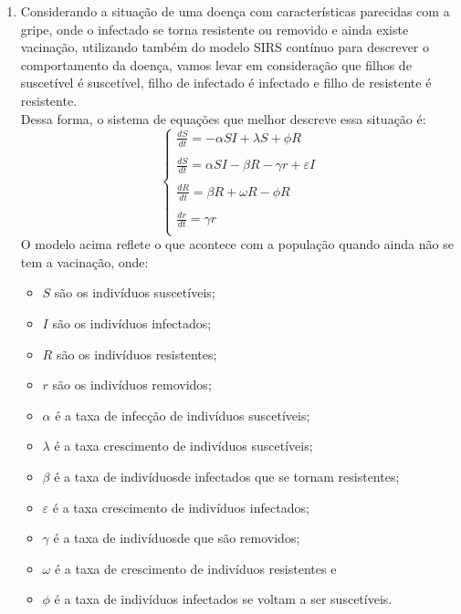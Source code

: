\documentclass[a4paper]{article}
\begin{document}
\begin{enumerate}
\item
Considerando a situa\c{c}\~ao de uma doen\c{c}a com caracter\'isticas parecidas com a gripe, onde o infectado se torna resistente ou removido e ainda existe vacina\c{c}\~ao, utilizando tamb\'em do modelo SIRS cont\'inuo para descrever o comportamento da doen\c{c}a, vamos levar em considera\c{c}\~ao que filhos de suscet\'ivel \'e suscet\'ivel, filho de infectado \'e infectado e filho de resistente \'e resistente. 
\\
Dessa forma, o sistema de equa\c{c}\~oes que melhor descreve essa situa\c{c}\~ao \'e:
\\
\begin{equation}
\left\{\begin{array}{l}
\frac{dS}{dt} = -\alpha SI + \lambda S + \phi R\\
\\
\frac{dS}{dt} = \alpha SI - \beta R - \gamma r + \varepsilon I\\
\\
\frac{dR}{dt} = \beta R + \omega R - \phi R \\
\\
\frac{dr}{dt} = \gamma r \\
\end{array}
\end{equation}
O modelo acima reflete o que acontece com a popula\c{c}\~ao quando ainda n\~ao se tem a vacina\c{c}\~ao, onde:
\begin{itemize}
\item$S$ s\~ao os indiv\'iduos suscet\'iveis;
\item$I$ s\~ao os indiv\'iduos infectados;
\item$R$ s\~ao os indiv\'iduos resistentes;
\item$r$ s\~ao os indiv\'iduos removidos;
\item$\alpha$ \'e a taxa de infec\c{c}\~ao de indiv\'iduos suscet\'iveis;
\item$\lambda$ \'e a taxa crescimento de indiv\'iduos suscet\'iveis;
\item$\beta$ \'e a taxa  de indiv\'iduosde infectados que se tornam resistentes;
\item$\varepsilon$ \'e a taxa crescimento de indiv\'iduos infectados;
\item$\gamma$ \'e a taxa  de indiv\'iduosde que s\~ao removidos;
\item$\omega$ \'e a taxa de crescimento de indiv\'iduos resistentes e
\item$\phi$ \'e a taxa de indiv\'iduos infectados se voltam a ser suscet\'iveis.

\end{itemize}
\end{enumerate}
\end{document}
